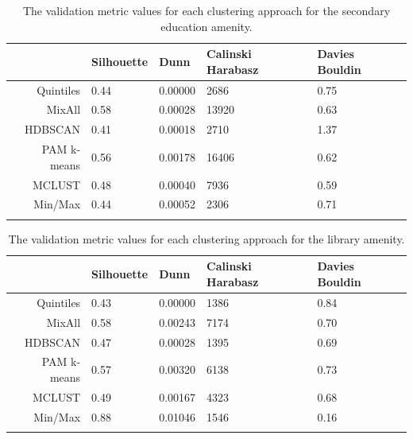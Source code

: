 \documentclass[11pt, a4paper]{article}
\begin{document}
\centering
\begin{longtable}[H]{|r|llll|}
  \hline
 & Silhouette & Dunn & Calinski Harabasz & Davies Bouldin \\ 
  \hline
Quintiles & 0.44 & 0.00000 &  2686 & 0.75 \\ 
   \hline
MixAll & 0.58 & 0.00028 & 13920 & 0.63 \\ 
   \hline
HDBSCAN & 0.41 & 0.00018 &  2710 & 1.37 \\ 
   \hline
PAM k-means & 0.56 & 0.00178 & 16406 & 0.62 \\ 
   \hline
MCLUST & 0.48 & 0.00040 &  7936 & 0.59 \\ 
   \hline
Min/Max & 0.44 & 0.00052 &  2306 & 0.71 \\ 
   \hline
\caption[Secondary education validation metrics]{The validation metric values for each clustering approach for the secondary education amenity.}\label{seceducvalid}
\end{longtable}









\centering
\begin{longtable}[H]{|r|llll|}
 \hline
 & Silhouette & Dunn & Calinski Harabasz & Davies Bouldin \\ 
  \hline
Quintiles & 0.43 & 0.00000 & 1386 & 0.84 \\ 
   \hline
MixAll & 0.58 & 0.00243 & 7174 & 0.70 \\ 
   \hline
HDBSCAN & 0.47 & 0.00028 & 1395 & 0.69 \\ 
   \hline
PAM k-means & 0.57 & 0.00320 & 6138 & 0.73 \\ 
   \hline
MCLUST & 0.49 & 0.00167 & 4323 & 0.68 \\ 
   \hline
Min/Max & 0.88 & 0.01046 & 1546 & 0.16 \\ 
   \hline
\caption[Library validation metrics]{The validation metric values for each clustering approach for the library amenity.}\label{libraryvalid}
\end{longtable}
\end{document}
